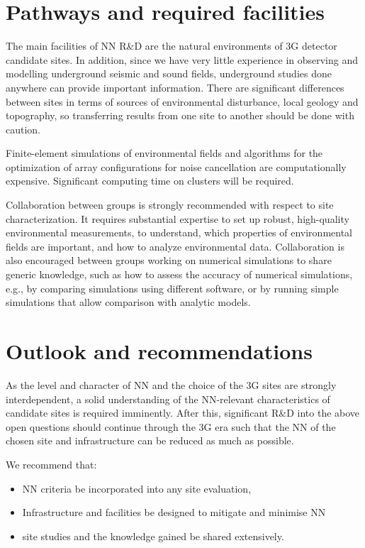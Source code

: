 \section{Pathways and required facilities}
The main facilities of NN R\&D are the natural environments of 3G detector candidate sites. In addition, since we have very little experience in observing and modelling underground seismic and sound fields, underground studies done anywhere can provide important information. There are significant differences between sites in terms of sources of environmental disturbance, local geology and topography, so transferring results from one site to another should be done with caution.

Finite-element simulations of environmental fields and algorithms for the optimization of array configurations for noise cancellation are computationally expensive. Significant computing time on clusters will be required. 

Collaboration between groups is strongly recommended with respect to site characterization. It requires substantial expertise to set up robust, high-quality environmental measurements, to understand, which properties of environmental fields are important, and how to analyze environmental data. Collaboration is also encouraged between groups working on numerical simulations to share generic knowledge, such as how to assess the accuracy of numerical simulations, e.g., by comparing simulations using different software, or by running simple simulations that allow comparison with analytic models.

\section{Outlook and recommendations}

As the level and character of NN and the choice of the 3G sites are strongly interdependent, a solid understanding of the NN-relevant characteristics of candidate sites is required imminently. After this, significant R\&D into the above open questions should continue through the 3G era such that the NN of the chosen site and infrastructure can be reduced as much as possible. 

We recommend that:
\begin{itemize}
\item NN criteria be incorporated into any site evaluation,
\item Infrastructure and facilities be designed to mitigate and minimise NN 
\item site studies and the knowledge  gained be shared extensively.
\end{itemize}


